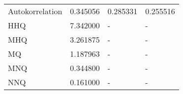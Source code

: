 \begin{tabular}{lrll}
              Autokorrelation &    0.345056 &                   0.285331 &                        0.255516 \\
                          HHQ &    7.342000 &                          - &                               - \\
                          MHQ &    3.261875 &                          - &                               - \\
                           MQ &    1.187963 &                          - &                               - \\
                          MNQ &    0.344800 &                          - &                               - \\
                          NNQ &    0.161000 &                          - &                               - \\
\bottomrule
\end{tabular}
